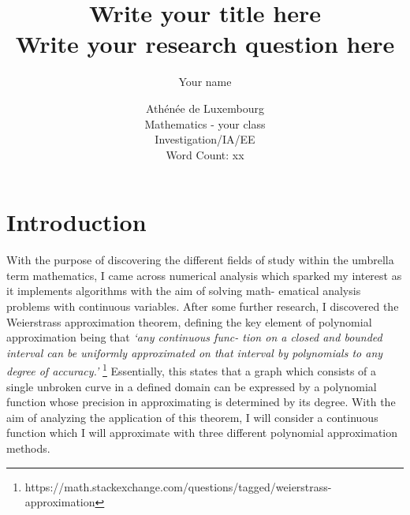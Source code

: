 \documentclass[footheight=20pt, footsepline, headheight=20pt, headsepline]{scrartcl}
\begin{document}
\title{Write your title here \\[1cm] \large{\textbf{Write your research question here}}\\[1cm]} 
\author{Your name}
\date{\vspace{10cm} Athénée de Luxembourg \\[0.5cm] Mathematics - your class \\[0.5cm] Investigation/IA/EE \\[0.5cm] Word Count: xx}
\maketitle
\newpage
\tableofcontents
\newpage
\section{Introduction}
With the purpose of discovering the different fields of study within the umbrella term mathematics, I came across numerical analysis which sparked my interest as it implements algorithms with the aim of solving math- ematical analysis problems with continuous variables. After some further research, I discovered the Weierstrass approximation theorem, defining the key element of polynomial approximation being that \textit{‘any continuous func- tion on a closed and bounded interval can be uniformly approximated on that interval by polynomials to any degree of accuracy.’} \footnote{https://math.stackexchange.com/questions/tagged/weierstrass-approximation} Essentially, this states that a graph which consists of a single unbroken curve in a defined domain can be expressed by a polynomial function whose precision in approximating is determined by its degree. With the aim of analyzing the application of this theorem, I will consider a continuous function which I will approximate with three different polynomial approximation methods.
\end{document}
